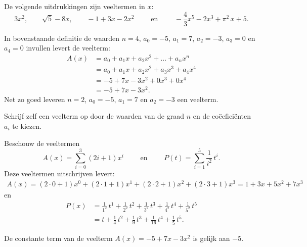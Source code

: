 \documentclass{ximera}
\begin{document}
\begin{example} 
De volgende uitdrukkingen zijn veeltermen in $x$:
\[
3x^2, 
\qquad \sqrt{5} - 8x, 
\qquad -1 + 3x -2x^2 
\qquad \text{ en } \qquad -\frac{4}{3}x^5 - 2x^3 + \pi^2\,x + 5. 
\]      
\end{example} 
    

\begin{example} 
In bovenstaande definitie de waarden $n = 4$, $a_0 = -5$, $a_1 = 7$, $a_2 = -3$, $a_3 = 0$ en $a_4 = 0$ invullen levert de veelterm: 
\begin{align*}
A(x) 
& = a_0 + a_1x + a_2x^2 + \dots + a_n x^n \\
& = a_0 + a_1x + a_2x^2 + a_3 x^3 + a_4 x^4 \\ 
& = -5 + 7x - 3x^2 + 0x^3 + 0x^4 \\
& = -5 + 7x - 3x^2.
\end{align*}
Net zo goed leveren $n = 2$, $a_0 = -5$, $a_1 = 7$ en $a_2 = -3$ een veelterm.
\end{example} 

\begin{exercise}
Schrijf zelf een veelterm op door de waarden van de graad \(n\) en de coëeficiënten \(a_i\) te kiezen.
\end{exercise}

\begin{example} 
Beschouw de veeltermen
\[
A(x) = \sum_{i=0}^3 (2i+1) x^i \qquad \text{ en } \qquad P(t) = \sum_{i=1}^5 \frac{1}{i^2} \, t^i.
\] 
Deze veeltermen uitschrijven levert: 
\begin{align*}
A(x)  = (2\cdot0+1)x^0 + (2\cdot1+1)x^1 + (2\cdot2+1)x^2 + (2\cdot3+1)x^3 = 1 + 3x + 5x^2 + 7x^3
\end{align*}
en
\begin{align*}
P(x) 
& = \frac{1}{1^2} \, t^1 + \frac{1}{2^2} \, t^2 + \frac{1}{3^2} \, t^3 + \frac{1}{4^2} \, t^4 + \frac{1}{5^2} \, t^5 \\
& = t + \frac{1}{4}\,t^2 + \frac{1}{9}\,t^3 + \frac{1}{16}\,t^4 + \frac{1}{5}\,t^5.
\end{align*}
\end{example} 



\begin{example} 
De constante term van de veelterm $A(x) = -5 + 7x - 3x^2$ is gelijk aan $-5$.  
\end{example} 
\end{document}
